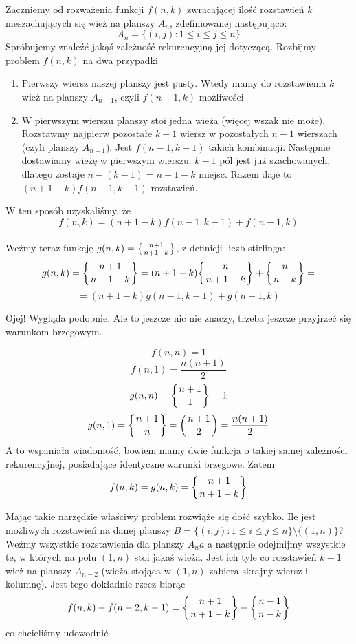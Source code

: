 \documentclass[a4paper,11pt]{article}
\begin{document}
\small Zaczniemy od rozważenia funkcji $f(n, k)$ zwracającej ilość rozstawień $k$ nieszachujących się wież na planszy $A_{n}$, zdefiniowanej następująco:
\[
	A_{n} = \{(i, j) : 1 \le i \le j \le n\}
\]
Spróbujemy znaleźć jakąś zależność rekurencyjną jej dotyczącą. Rozbijmy problem $f(n, k)$ na dwa przypadki
\begin{enumerate}
\item{Pierwszy wiersz naszej planszy jest pusty. Wtedy mamy do rozstawienia $k$ wież na planszy $A_{n-1}$, czyli $f(n-1, k)$ możliwości }
\item{W pierwszym wierszu planszy stoi jedna wieża (więcej wszak nie może). Rozstawmy najpierw pozostałe $k-1$ wiersz w pozostałych $n-1$ wierszach (czyli planszy $A_{n-1}$). Jest $f(n-1, k-1)$ takich kombinacji. Następnie dostawiamy wieżę w pierwszym wierszu. $k-1$ pól jest już szachowanych, dlatego zostaje $n - (k - 1) = n + 1 - k$ miejsc. Razem daje to $(n + 1 - k)f(n-1, k-1)$ rozstawień.  }
\end{enumerate}
W ten sposób uzyskaliśmy, że
\[
f(n, k) = (n + 1 - k)f(n-1, k-1) + f(n-1, k)
\]
\\
Weźmy teraz funkcję $g(n, k) = \big\{ {n + 1 \atop n + 1 - k} \big\}$, z definicji liczb stirlinga:
\[
g(n, k) = \bigg\{ {n + 1 \atop n + 1 - k} \bigg\} = (n + 1 - k)\bigg\{ {n \atop n + 1 - k} \bigg\} + \bigg\{ {n \atop n - k} \bigg\} =
\]
\[
= (n + 1 - k)g(n-1, k-1) + g(n-1, k)
\]

Ojej! Wygląda podobnie. Ale to jeszcze nic nie znaczy, trzeba jeszcze przyjrzeć się warunkom brzegowym.

\[
f(n, n) = 1
\]
\[
f(n, 1) = \frac{n(n+1)}{2}
\]
\[
g(n, n) = \bigg\{ {n + 1 \atop 1} \bigg\} = 1
\]
\[
g(n, 1) = \bigg\{ {n + 1 \atop n } \bigg\} = \bigg( {n + 1 \atop 2} \bigg) = \frac{n(n+1)}{2}
\]
A to wspaniała wiadomość, bowiem mamy dwie funkcja o takiej samej zależności rekurencyjnej, posiadające identyczne warunki brzegowe. Zatem 
\[
f(n,k) = g(n,k) = \bigg\{ {n + 1 \atop n + 1 - k} \bigg\}
\]

Mając takie narzędzie właściwy problem rozwiąże się dość szybko. Ile jest możliwych rozstawień na danej planszy $B = \{ (i,j) : 1 \le i \le j \le n \}\setminus\{(1, n)\}$?
Weźmy wszystkie rozstawienia dla planszy $A_{n}a$ a następnie odejmijmy wszystkie te, w których na polu $(1, n)$ stoi jakaś wieża. Jest ich tyle co rozstawień $k-1$ wież na planszy $A_{n-2}$ (wieża stojąca w $(1,n)$ zabiera skrajny wiersz i kolumnę). Jest tego dokładnie rzecz biorąc
\[
  f(n, k) - f(n-2, k-1) = \bigg\{ {n + 1 \atop n + 1 - k} \bigg\} - \bigg\{ {n - 1 \atop n - k} \bigg\}
\]
co chcieliśmy udowodnić
\end{document}
